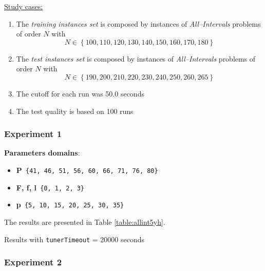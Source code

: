 \underline{Study cases:}
\begin{enumerate}
	\item The {\it training instances set} is composed by instances of {\it All--Intervals} problems of order $N$ with $$N \in \left\{100, 110, 120, 130, 140, 150, 160, 170, 180\right\}$$
	\item The {\it test instances set} is composed by instances of {\it All--Intervals} problems of order $N$ with $$N \in \left\{190, 200, 210, 220, 230, 240, 250, 260, 265\right\}$$
	\item The cutoff for each run was 50.0 seconds
	\item The test quality is based on 100 runs
\end{enumerate}

\subsubsection{ Experiment 1}

{\bf Parameters domains}:

\begin{itemize}[itemsep=0.2mm]
	\item {\bf P}\texttt{ \{41, 46, 51, 56, 60, 66, 71, 76, 80\}}
	\item {\bf F, f, l}\texttt{ \{0, 1, 2, 3\}}
	\item {\bf p}\texttt{ \{5, 10, 15, 20, 25, 30, 35\}}
\end{itemize}

The results are presented in Table \ref{table:allint5yh}.

\begin{table}[H] 
	\caption{Results with \texttt{tunerTimeout} = 20000 seconds}
	\centering 
	\renewcommand{\arraystretch}{1.2}
	\label{table:allint5yh}
\end{table}

\subsubsection{ Experiment 2}

